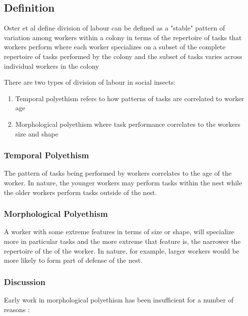 
\subsection{Definition}
\label{sec:second:definition}

Oster et al \cite{oster1978caste} define division of labour can be defined as a "stable" pattern of variation among workers within a colony in terms of the repertoire of tasks that workers perform where each worker specializes on a subset of the complete repertoire of tasks performed by the colony and the subset of tasks varies across individual workers in the colony %

There are two types of division of labour in social insects: 
\begin{enumerate}
	\item Temporal polyethism refers to how patterns of tasks are correlated to worker age
	\item Morphological polyethism where task performance correlates to the workers size and shape
\end{enumerate}

\subsubsection{Temporal Polyethism}
The pattern of tasks being performed by workers correlates to the age of the worker. In nature, the younger workers may perform tasks within the nest while the older workers perform tasks outside of the nest.
\subsubsection{Morphological Polyethism}
A worker with some extreme features in terms of size or shape, will specialize more in particular tasks and the more extreme that feature is, the narrower the repertoire of the of the worker. In nature, for example, larger workers would be more likely to form part of defense of the nest. \cite{beshers2001models}

\subsubsection{Discussion}
Early work in morphological polyethism has been insufficient for a number of reasons \cite{huang1996regulation}: 

